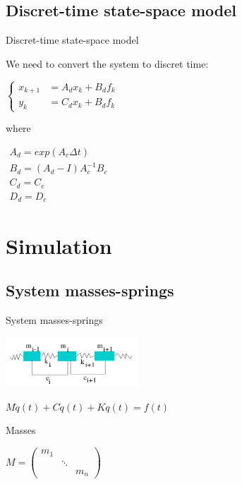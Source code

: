 \documentclass{beamer}
\begin{document}
\subsection{Discret-time state-space model}
\begin{frame}{Discret-time state-space model}

We need to convert the system to discret time:

\begin{center}

$\left\{
\begin{array}{ll}
x_{k+1} & = A_dx_k + B_df_k \\
y_k & = C_dx_k + B_df_k
\end{array}
\right.$


\end{center}

where

\begin{center}


$\begin{array}{ll}
A_d = exp(A_c \Delta t) \\
B_d= (A_d - I) A^{-1}_c B_c \\
C_d = C_c \\
D_d = D_c
\end{array}$

\end{center}


\end{frame}



\section{Simulation}

\subsection{System masses-springs}
\begin{frame}{System masses-springs}
\begin{center}
\includegraphics[width=5cm]{images/ressorts.png}

$M \ddot{q}(t) + C \dot{q}(t) + K q(t) = f(t)$
\end{center}

\pause

\begin{exampleblock}{Masses}
\begin{center}
$
M = 
\begin{pmatrix} 
m_1\\ 
&\ddots\\ 
&&m_n
\end{pmatrix}
$
\end{center}
\end{exampleblock}

\end{frame}
\end{document}
